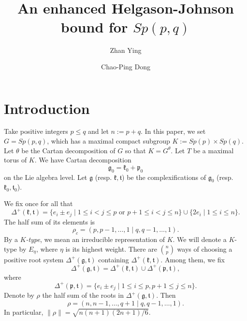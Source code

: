 \documentclass[11pt]{amsart}
\theoremstyle{plain}
\theoremstyle{definition}
\newcommand{\frg}{\mathfrak{g}}
\newcommand{\frk}{\mathfrak{k}}
\newcommand{\frp}{\mathfrak{p}}
\newcommand{\frt}{\mathfrak{t}}
\begin{document}
\title[An enhanced Helgason-Johnson bound for $Sp(p, q)$]
{An enhanced Helgason-Johnson bound for $Sp(p, q)$}

\author{Zhan Ying}
\address[Ying]{School of Mathematical Sciences, Soochow University, Suzhou 215006,
P.~R.~China}


\author{Chao-Ping Dong}
\address[Dong]{School of Mathematical Sciences, Soochow University, Suzhou 215006,
P.~R.~China}










\endabstract





\maketitle


\section{Introduction}
Take positive integers $ p\le q$ and let $n:=p+q$. In this paper, we set $G=Sp(p, q)$, which has a maximal compact subgroup $K:= Sp(p)\times Sp(q)$. Let $\theta$ be the Cartan decomposition of $G$ so that $K=G^{\theta}$. Let $T$ be a maximal torus of $K$.  We have Cartan decomposition
$$
\frg_0=\frk_0 + \frp_0
$$
on the Lie algebra level. Let $\frg$ (resp. $\frk, \frt$) be the complexifications of $\frg_0$ (resp. $\frk_0, \frt_0$).

We fix 	once for all that
$$
\Delta^+(\frk, \frt)=\{e_i\pm e_j\mid\mbox{$1\le i<j\le p$ or $p+1\le i<j\le n$}\}\cup\{2e_i\mid 1\le i\le n\}.
$$
The half sum of its elements is
$$
\rho_c=(p,p-1,\dots,1\mid q,q-1,\dots,1).
$$
By a \emph{$K$-type}, we mean an irreducible representation of $K$. We will denote a $K$-type by $E_{\eta}$, where $\eta$ is its highest weight. There are ${n \choose p}$ ways of choosing a positive root system $\Delta^+(\frg, \frt)$ containing $\Delta^+(\frk, \frt)$. Among them, we fix
$$
\Delta^+(\frg, \frt)=\Delta^+(\frk, \frt) \cup \Delta^+(\frp,\frt),
$$
where
$$
\Delta^+(\frp,\frt)=\{e_i\pm e_j\mid 1\le i\le p, p+1\le j\le n\}.
$$
Denote by $\rho$ the half sum of the roots in $\Delta^+(\frg, \frt)$. Then
$$
\rho=(n,n-1,\dots,q+1\mid q,q-1,\dots,1).
$$
In particular, $\|\rho\|=\sqrt{n(n+1)(2n+1)/6}$.
\end{document}
